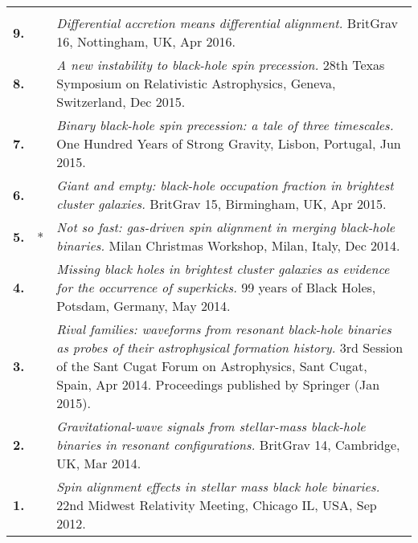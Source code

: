 \documentclass[letterpaper]{moderncv}
\begin{document}
{\begin{longtable}{rp{0.4cm}p{15.8cm}}
\vspace{0.05cm}\\
%
\textbf{9.} & & \textit{Differential accretion means differential alignment.}
\newline{}BritGrav 16, Nottingham, UK, Apr 2016.
\vspace{0.05cm}\\
%
\textbf{8.} & & \textit{A new instability to black-hole spin precession.}
\newline{}28th Texas Symposium on Relativistic Astrophysics, Geneva, Switzerland, Dec 2015.
\vspace{0.05cm}\\
%
\textbf{7.} & & \textit{Binary black-hole spin precession: a tale of three timescales.}
\newline{} 
One Hundred Years of Strong Gravity, Lisbon, Portugal, Jun 2015.
\vspace{0.05cm}\\
%
\textbf{6.} & & \textit{Giant and empty: black-hole occupation fraction in brightest cluster galaxies.}
\newline{} 
BritGrav 15, Birmingham, UK, Apr 2015.
\vspace{0.05cm}\\
%
\textbf{5.} & * & \textit{Not so fast: gas-driven spin alignment in merging black-hole binaries.}
\newline{} 
Milan Christmas Workshop, Milan, Italy, Dec 2014.
\vspace{0.05cm}\\
%
\textbf{4.} & & \textit{Missing black holes in brightest cluster galaxies as evidence for the occurrence of superkicks.}
\newline{} 
99 years of Black Holes, Potsdam, Germany, May 2014.
\vspace{0.05cm}\\
%
\textbf{3.} & & \textit{Rival families: waveforms from resonant black-hole binaries as probes of their astrophysical formation history.}
\newline{} 
3rd Session of the Sant Cugat Forum on Astrophysics, Sant Cugat, Spain, Apr 2014.
\newline{} 
Proceedings published by Springer (Jan 2015).
\vspace{0.05cm}\\
%
\textbf{2.} & & \textit{Gravitational-wave signals from stellar-mass black-hole binaries in resonant configurations.}
\newline{} 
BritGrav 14, Cambridge, UK, Mar 2014.
\vspace{0.05cm}\\
%
\textbf{1.} & & \textit{Spin alignment effects in stellar mass black hole binaries.}
\newline{} 
22nd Midwest Relativity Meeting, Chicago IL, USA, Sep 2012.
\vspace{0.05cm}\\
\end{longtable}
}
\end{document}
